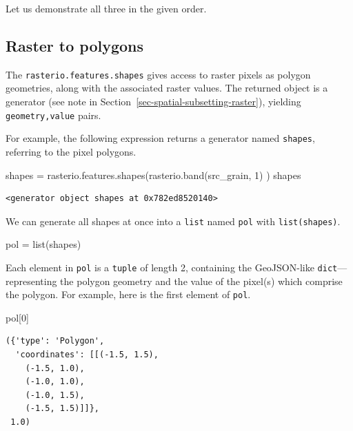 \documentclass[
  letterpaper,
]{krantz}
\newenvironment{Shaded}{\begin{snugshade}}{\end{snugshade}}
\newcommand{\BuiltInTok}[1]{\textcolor[rgb]{0.00,0.23,0.31}{#1}}
\newcommand{\DecValTok}[1]{\textcolor[rgb]{0.68,0.00,0.00}{#1}}
\newcommand{\NormalTok}[1]{\textcolor[rgb]{0.00,0.23,0.31}{#1}}
\newcommand{\OperatorTok}[1]{\textcolor[rgb]{0.37,0.37,0.37}{#1}}
\begin{document}
Let us demonstrate all three in the given order.

\subsection{Raster to polygons}\label{sec-raster-to-polygons}

The \texttt{rasterio.features.shapes} gives access to raster pixels as
polygon geometries, along with the associated raster values. The
returned object is a generator (see note in
Section~\ref{sec-spatial-subsetting-raster}), yielding
\texttt{geometry,value} pairs.

For example, the following expression returns a generator named
\texttt{shapes}, referring to the pixel polygons.

\begin{Shaded}
\begin{Highlighting}[]
\NormalTok{shapes }\OperatorTok{=}\NormalTok{ rasterio.features.shapes(rasterio.band(src\_grain, }\DecValTok{1}\NormalTok{) )}
\NormalTok{shapes}
\end{Highlighting}
\end{Shaded}

\begin{verbatim}
<generator object shapes at 0x782ed8520140>
\end{verbatim}

We can generate all shapes at once into a \texttt{list} named
\texttt{pol} with \texttt{list(shapes)}.

\begin{Shaded}
\begin{Highlighting}[]
\NormalTok{pol }\OperatorTok{=} \BuiltInTok{list}\NormalTok{(shapes)}
\end{Highlighting}
\end{Shaded}

Each element in \texttt{pol} is a \texttt{tuple} of length 2, containing
the GeoJSON-like \texttt{dict}---representing the polygon geometry and
the value of the pixel(s) which comprise the polygon. For example, here
is the first element of \texttt{pol}.

\begin{Shaded}
\begin{Highlighting}[]
\NormalTok{pol[}\DecValTok{0}\NormalTok{]}
\end{Highlighting}
\end{Shaded}

\begin{verbatim}
({'type': 'Polygon',
  'coordinates': [[(-1.5, 1.5),
    (-1.5, 1.0),
    (-1.0, 1.0),
    (-1.0, 1.5),
    (-1.5, 1.5)]]},
 1.0)
\end{verbatim}
\end{document}
